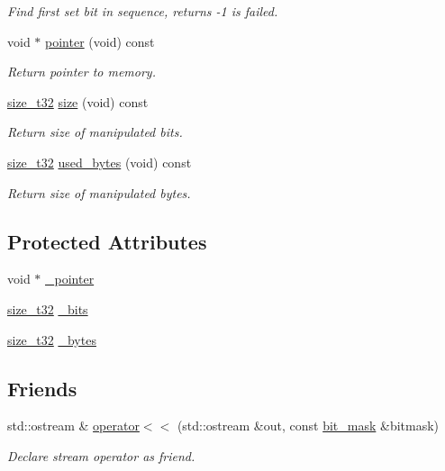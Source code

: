 \begin{DoxyCompactItemize}
\begin{DoxyCompactList}\small\item\em Find first set bit in sequence, returns -\/1 is failed. \end{DoxyCompactList}\item 
void $\ast$ \hyperlink{classcrap_1_1bit__mask_a18d0d45733d73f81f8366e23ca094db4}{pointer} (void) const 
\begin{DoxyCompactList}\small\item\em Return pointer to memory. \end{DoxyCompactList}\item 
\hyperlink{types_8h_a38c0a12279ffe0fabec44939e753c914}{size\-\_\-t32} \hyperlink{classcrap_1_1bit__mask_a8bdd624a4eec41c6de938397f67986bd}{size} (void) const 
\begin{DoxyCompactList}\small\item\em Return size of manipulated bits. \end{DoxyCompactList}\item 
\hyperlink{types_8h_a38c0a12279ffe0fabec44939e753c914}{size\-\_\-t32} \hyperlink{classcrap_1_1bit__mask_a9848eea9096e1dfd844218f2ddf4ecba}{used\-\_\-bytes} (void) const 
\begin{DoxyCompactList}\small\item\em Return size of manipulated bytes. \end{DoxyCompactList}\end{DoxyCompactItemize}
\subsection*{Protected Attributes}
\begin{DoxyCompactItemize}
\item 
void $\ast$ \hyperlink{classcrap_1_1bit__mask_ae17fa85acdd359a55c29d22e2b0eda06}{\-\_\-pointer}
\item 
\hyperlink{types_8h_a38c0a12279ffe0fabec44939e753c914}{size\-\_\-t32} \hyperlink{classcrap_1_1bit__mask_ae81a3f9f9e8d8bad564985882b1b9a5d}{\-\_\-bits}
\item 
\hyperlink{types_8h_a38c0a12279ffe0fabec44939e753c914}{size\-\_\-t32} \hyperlink{classcrap_1_1bit__mask_ad2e0fc867c1197151d99c1b6b01384aa}{\-\_\-bytes}
\end{DoxyCompactItemize}
\subsection*{Friends}
\begin{DoxyCompactItemize}
\item 
std\-::ostream \& \hyperlink{classcrap_1_1bit__mask_a9022f18a60ecf31fe105c14cd53e6b55}{operator$<$$<$} (std\-::ostream \&out, const \hyperlink{classcrap_1_1bit__mask}{bit\-\_\-mask} \&bitmask)
\begin{DoxyCompactList}\small\item\em Declare stream operator as friend. \end{DoxyCompactList}\end{DoxyCompactItemize}


